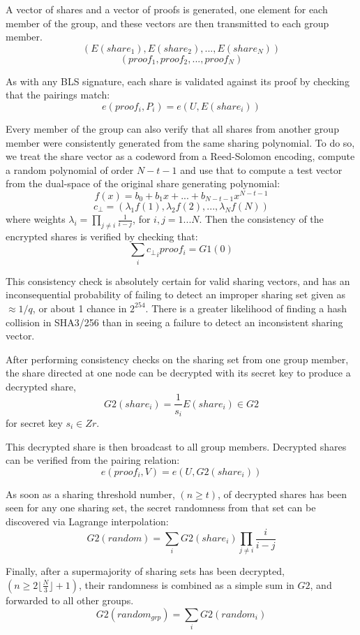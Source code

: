 \documentclass[article,oneside]{memoir}
\begin{document}
A vector of shares and a vector of proofs is generated, one element for each member of the group, and these vectors are then transmitted to each group member.
$$(E(share_1), E(share_2), ..., E(share_N))$$
$$ (proof_1, proof_2, ..., proof_N)$$

As with any BLS signature, each share is validated against its proof by checking that the pairings match:
$$ e(proof_i, P_i) = e(U, E(share_i))$$

Every member of the group can also verify that all shares from another group member were consistently generated from the same sharing polynomial. To do so, we treat the share vector as a codeword from a Reed-Solomon encoding\cite{scrape}, compute a random polynomial of order $N - t - 1$ and use that to compute a test vector from the dual-space of the original share generating polynomial:
$$f(x) = b_0 + b_1 x + ... + b_{N-t-1} x^{N-t-1}$$
$$c_{\perp} = (\lambda_1 f(1), \lambda_2 f(2), ... , \lambda_N f(N))$$
where weights $\lambda_i = \prod_{j \ne i} \frac{1}{i-j}$, for $ i,j = 1...N$.
Then the consistency of the encrypted shares is verified by checking that:
$$\sum_i {c_{\perp}}_i proof_i = G1(0)$$

This consistency check is absolutely certain for valid sharing vectors, and has an inconsequential probability of failing to detect an improper sharing set given as $\approx 1/q$, or about 1 chance in $2^{254}$. There is a greater likelihood of finding a hash collision in SHA3/256 than in seeing a failure to detect an inconsistent sharing vector.

After performing consistency checks on the sharing set from one group member, the share directed at one node can be decrypted with its secret key to produce a decrypted share, $$G2(share_i) = \frac{1}{s_i}E(share_i) \in G2$$ for secret key $s_i \in Zr$.

This decrypted share is then broadcast to all group members. Decrypted shares can be verified from the pairing relation:
$$ e(proof_i, V) = e(U, G2(share_i))$$

As soon as a sharing threshold number, $(n \ge t)$, of decrypted shares has been seen for any one sharing set, the secret randomness from that set can be discovered via Lagrange interpolation:
$$G2(random) = \sum_i G2(share_i) \prod_{j \ne i} \frac{i}{i-j}$$

Finally, after a supermajority of sharing sets has been decrypted, $(n \ge 2 \lfloor \frac{N}{3} \rfloor + 1)$, their randomness is combined as a simple sum in $G2$, and forwarded to all other groups.
$$G2(random_{grp}) = \sum_i G2(random_i)$$
\end{document}
